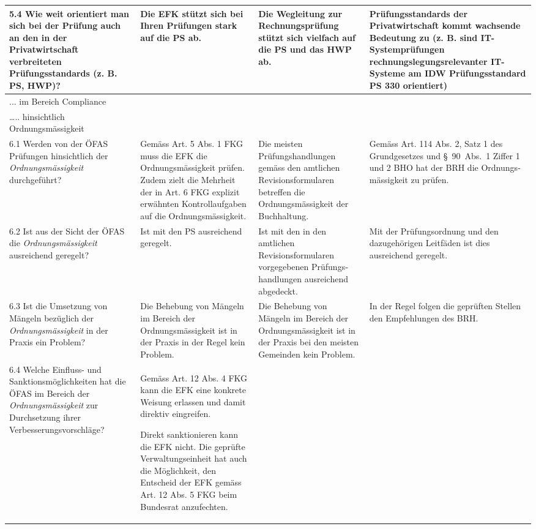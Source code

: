 \documentclass[10pt]{article}
\begin{document}
\begin{landscape}
\begin{center}
\begin{longtable}{|p{4cm}|p{5cm}|p{7.5cm}|p{7.5cm}|}
 \\
\hline
5.4 Wie weit orientiert man sich bei der Prüfung auch an den in der Privatwirtschaft verbreiteten Prüfungsstandards (z. B. PS, HWP)? & Die EFK stützt sich bei Ihren Prüfungen stark auf die PS ab. & Die Wegleitung zur Rechnungsprüfung stützt sich vielfach auf die PS und das HWP ab. & Prüfungsstandards der Privatwirtschaft kommt wachsende Bedeutung zu (z. B. sind  IT-System­prüfungen rechnungslegungsrelevanter IT-Systeme am IDW Prüfungsstandard PS 330 orientiert) \\
\hline
... im Bereich Compliance &  &  &  \\
\hline
….. hinsichtlich Ordnungsmässigkeit &  &  &  \\
\hline
6.1 Werden von der ÖFAS Prüfungen hinsichtlich der \textit{Ordnungsmässigkeit} durchgeführt? & Gemäss Art. 5 Abs. 1 FKG muss die EFK die Ordnungsmässigkeit prüfen. Zudem zielt die Mehrheit der in Art. 6 FKG explizit erwähnten Kontrollaufgaben auf die Ordnungs­mässigkeit. & Die meisten Prüfungshandlungen gemäss den amtlichen Revisionsformularen betreffen die Ordnungsmässigkeit der Buchhaltung. & Gemäss Art. 114 Abs. 2, Satz 1 des Grundgesetzes und §~90~Abs.~1 Ziffer 1 und 2 BHO hat der BRH die Ordnungs­mässigkeit zu prüfen. \\
\hline
6.2 Ist aus der Sicht der ÖFAS die \textit{Ordnungsmässigkeit} ausreichend geregelt? & Ist mit den PS ausreichend geregelt. & Ist mit den in den amtlichen Revisionsformularen vorgegebenen Prüfungs­handlungen ausreichend abgedeckt. & Mit der Prüfungsordnung und den dazugehörigen Leitfäden ist dies ausreichend geregelt. \\
\hline
6.3 Ist die Umsetzung von Mängeln bezüglich der \textit{Ordnungsmässigkeit} in der Praxis ein Problem? & Die Behebung von Mängeln im Bereich der Ordnungsmässigkeit ist in der Praxis in der Regel kein Problem. & Die Behebung von Mängeln im Bereich der Ordnungsmässigkeit ist in der Praxis bei den meisten Gemeinden kein Problem. & In der Regel folgen die geprüften Stellen den Empfehlungen des BRH. \\
\hline
6.4 Welche Einfluss- und Sanktionsmöglichkeiten hat die ÖFAS im Bereich der \textit{Ordnungsmässigkeit} zur Durchsetzung ihrer Verbesserungsvorschläge? & Gemäss Art. 12 Abs. 4 FKG kann die EFK eine konkrete Weisung erlassen und damit direktiv eingreifen.

Direkt sanktionieren kann die EFK nicht. Die geprüfte Verwaltungseinheit hat auch die Möglichkeit, den Entscheid der EFK gemäss Art. 12 Abs. 5 FKG beim Bundesrat anzufechten. 


\end{longtable}
\end{center}
\end{landscape}
\end{document}
